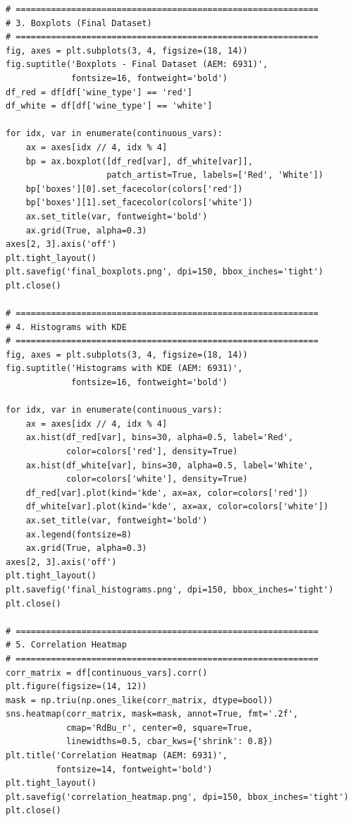 \documentclass[12pt,a4paper]{article}
\begin{document}
\begin{lstlisting}
# ============================================================
# 3. Boxplots (Final Dataset)
# ============================================================
fig, axes = plt.subplots(3, 4, figsize=(18, 14))
fig.suptitle('Boxplots - Final Dataset (AEM: 6931)',
             fontsize=16, fontweight='bold')
df_red = df[df['wine_type'] == 'red']
df_white = df[df['wine_type'] == 'white']

for idx, var in enumerate(continuous_vars):
    ax = axes[idx // 4, idx % 4]
    bp = ax.boxplot([df_red[var], df_white[var]],
                    patch_artist=True, labels=['Red', 'White'])
    bp['boxes'][0].set_facecolor(colors['red'])
    bp['boxes'][1].set_facecolor(colors['white'])
    ax.set_title(var, fontweight='bold')
    ax.grid(True, alpha=0.3)
axes[2, 3].axis('off')
plt.tight_layout()
plt.savefig('final_boxplots.png', dpi=150, bbox_inches='tight')
plt.close()

# ============================================================
# 4. Histograms with KDE
# ============================================================
fig, axes = plt.subplots(3, 4, figsize=(18, 14))
fig.suptitle('Histograms with KDE (AEM: 6931)',
             fontsize=16, fontweight='bold')

for idx, var in enumerate(continuous_vars):
    ax = axes[idx // 4, idx % 4]
    ax.hist(df_red[var], bins=30, alpha=0.5, label='Red',
            color=colors['red'], density=True)
    ax.hist(df_white[var], bins=30, alpha=0.5, label='White',
            color=colors['white'], density=True)
    df_red[var].plot(kind='kde', ax=ax, color=colors['red'])
    df_white[var].plot(kind='kde', ax=ax, color=colors['white'])
    ax.set_title(var, fontweight='bold')
    ax.legend(fontsize=8)
    ax.grid(True, alpha=0.3)
axes[2, 3].axis('off')
plt.tight_layout()
plt.savefig('final_histograms.png', dpi=150, bbox_inches='tight')
plt.close()

# ============================================================
# 5. Correlation Heatmap
# ============================================================
corr_matrix = df[continuous_vars].corr()
plt.figure(figsize=(14, 12))
mask = np.triu(np.ones_like(corr_matrix, dtype=bool))
sns.heatmap(corr_matrix, mask=mask, annot=True, fmt='.2f',
            cmap='RdBu_r', center=0, square=True,
            linewidths=0.5, cbar_kws={'shrink': 0.8})
plt.title('Correlation Heatmap (AEM: 6931)',
          fontsize=14, fontweight='bold')
plt.tight_layout()
plt.savefig('correlation_heatmap.png', dpi=150, bbox_inches='tight')
plt.close()


\end{lstlisting}
\end{document}
